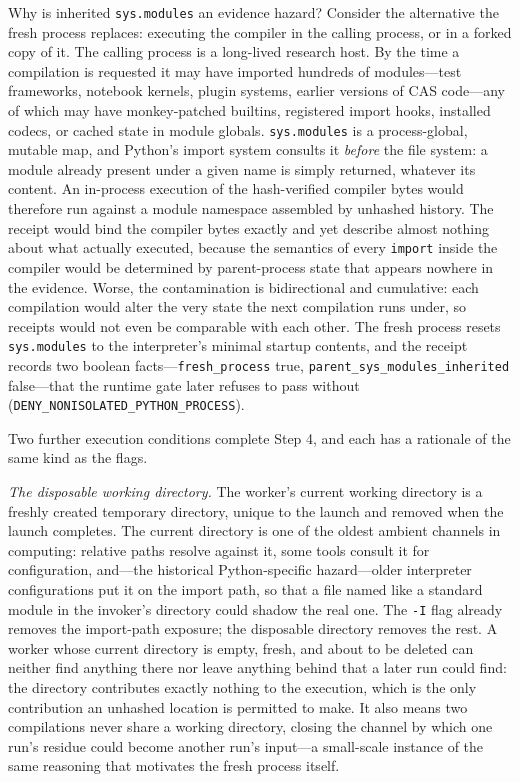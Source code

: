 Why is inherited \texttt{sys.modules} an evidence hazard? Consider the alternative the fresh process replaces: executing the compiler in the calling process, or in a forked copy of it. The calling process is a long-lived research host. By the time a compilation is requested it may have imported hundreds of modules---test frameworks, notebook kernels, plugin systems, earlier versions of CAS code---any of which may have monkey-patched builtins, registered import hooks, installed codecs, or cached state in module globals. \texttt{sys.modules} is a process-global, mutable map, and Python's import system consults it \emph{before} the file system: a module already present under a given name is simply returned, whatever its content. An in-process execution of the hash-verified compiler bytes would therefore run against a module namespace assembled by unhashed history. The receipt would bind the compiler bytes exactly and yet describe almost nothing about what actually executed, because the semantics of every \texttt{import} inside the compiler would be determined by parent-process state that appears nowhere in the evidence. Worse, the contamination is bidirectional and cumulative: each compilation would alter the very state the next compilation runs under, so receipts would not even be comparable with each other. The fresh process resets \texttt{sys.modules} to the interpreter's minimal startup contents, and the receipt records two boolean facts---\texttt{fresh\_process} true, \texttt{parent\_sys\_modules\_inherited} false---that the runtime gate later refuses to pass without (\texttt{DENY\_NONISOLATED\_PYTHON\_PROCESS}).

Two further execution conditions complete Step 4, and each has a rationale of the same kind as the flags.

\emph{The disposable working directory.} The worker's current working directory is a freshly created temporary directory, unique to the launch and removed when the launch completes. The current directory is one of the oldest ambient channels in computing: relative paths resolve against it, some tools consult it for configuration, and---the historical Python-specific hazard---older interpreter configurations put it on the import path, so that a file named like a standard module in the invoker's directory could shadow the real one. The \texttt{-I} flag already removes the import-path exposure; the disposable directory removes the rest. A worker whose current directory is empty, fresh, and about to be deleted can neither find anything there nor leave anything behind that a later run could find: the directory contributes exactly nothing to the execution, which is the only contribution an unhashed location is permitted to make. It also means two compilations never share a working directory, closing the channel by which one run's residue could become another run's input---a small-scale instance of the same reasoning that motivates the fresh process itself.

